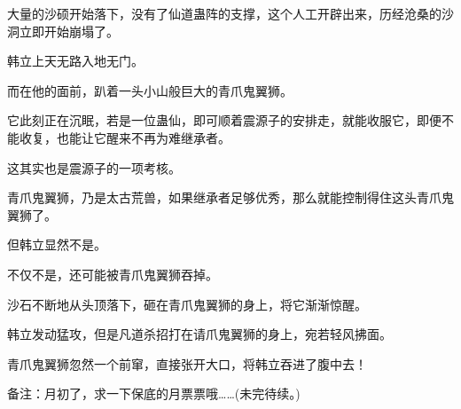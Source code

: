 \begin{this_body}
大量的沙硕开始落下，没有了仙道蛊阵的支撑，这个人工开辟出来，历经沧桑的沙洞立即开始崩塌了。

韩立上天无路入地无门。

而在他的面前，趴着一头小山般巨大的青爪鬼翼狮。

它此刻正在沉眠，若是一位蛊仙，即可顺着震源子的安排走，就能收服它，即便不能收复，也能让它醒来不再为难继承者。

这其实也是震源子的一项考核。

青爪鬼翼狮，乃是太古荒兽，如果继承者足够优秀，那么就能控制得住这头青爪鬼翼狮了。

但韩立显然不是。

不仅不是，还可能被青爪鬼翼狮吞掉。

沙石不断地从头顶落下，砸在青爪鬼翼狮的身上，将它渐渐惊醒。

韩立发动猛攻，但是凡道杀招打在请爪鬼翼狮的身上，宛若轻风拂面。

青爪鬼翼狮忽然一个前窜，直接张开大口，将韩立吞进了腹中去！

备注：月初了，求一下保底的月票票哦……(未完待续。)

\end{this_body}

